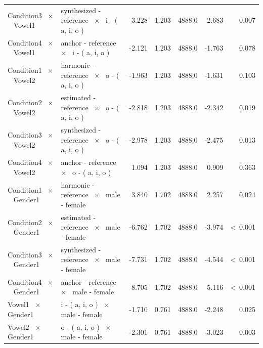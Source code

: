 \documentclass[a4paper,man,hidelinks,floatsintext]{apa7}
\begin{document}
\begin{table}[!htbp]
\begin{adjustbox}{max size={\columnwidth}{\textheight}}
\begin{tabular}{llrrrrr}
Condition3 ~$\times$~ Vowel1                    & synthesized - reference ~$\times$~ i - ( a, i, o )                          &    3.228 & 1.203 & 4888.0 &   2.683 &           0.007 \\
Condition4 ~$\times$~ Vowel1                    & anchor - reference ~$\times$~ i - ( a, i, o )                               &   -2.121 & 1.203 & 4888.0 &  -1.763 &           0.078 \\
Condition1 ~$\times$~ Vowel2                    & harmonic - reference ~$\times$~ o - ( a, i, o )                             &   -1.963 & 1.203 & 4888.0 &  -1.631 &           0.103 \\
Condition2 ~$\times$~ Vowel2                    & estimated - reference ~$\times$~ o - ( a, i, o )                            &   -2.818 & 1.203 & 4888.0 &  -2.342 &           0.019 \\
Condition3 ~$\times$~ Vowel2                    & synthesized - reference ~$\times$~ o - ( a, i, o )                          &   -2.978 & 1.203 & 4888.0 &  -2.475 &           0.013 \\
Condition4 ~$\times$~ Vowel2                    & anchor - reference ~$\times$~ o - ( a, i, o )                               &    1.094 & 1.203 & 4888.0 &   0.909 &           0.363 \\
Condition1 ~$\times$~ Gender1                   & harmonic - reference ~$\times$~ male - female                               &    3.840 & 1.702 & 4888.0 &   2.257 &           0.024 \\
Condition2 ~$\times$~ Gender1                   & estimated - reference ~$\times$~ male - female                              &   -6.762 & 1.702 & 4888.0 &  -3.974 & \textless~0.001 \\
Condition3 ~$\times$~ Gender1                   & synthesized - reference ~$\times$~ male - female                            &   -7.731 & 1.702 & 4888.0 &  -4.544 & \textless~0.001 \\
Condition4 ~$\times$~ Gender1                   & anchor - reference ~$\times$~ male - female                                 &    8.705 & 1.702 & 4888.0 &   5.116 & \textless~0.001 \\
Vowel1 ~$\times$~ Gender1                       & i - ( a, i, o ) ~$\times$~ male - female                                    &   -1.710 & 0.761 & 4888.0 &  -2.248 &           0.025 \\
Vowel2 ~$\times$~ Gender1                       & o - ( a, i, o ) ~$\times$~ male - female                                    &   -2.301 & 0.761 & 4888.0 &  -3.023 &           0.003 \\

\end{tabular}
\end{adjustbox}
\end{table}
\end{document}

